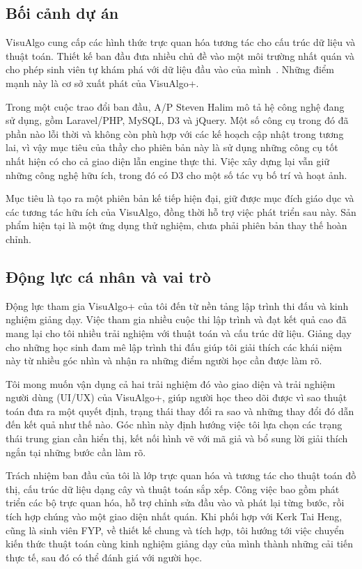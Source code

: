 \documentclass[11pt,a4paper]{article}
\begin{document}
\subsection{Bối cảnh dự án}
VisuAlgo cung cấp các hình thức trực quan hóa tương tác cho cấu trúc dữ liệu và thuật toán. Thiết kế ban đầu đưa nhiều chủ đề vào một môi trường nhất quán và cho phép sinh viên tự khám phá với dữ liệu đầu vào của mình~\cite{halim2012}. Những điểm mạnh này là cơ sở xuất phát của VisuAlgo+.

Trong một cuộc trao đổi ban đầu, A/P Steven Halim mô tả hệ công nghệ đang sử dụng, gồm Laravel/PHP, MySQL, D3 và jQuery. Một số công cụ trong đó đã phần nào lỗi thời và không còn phù hợp với các kế hoạch cập nhật trong tương lai, vì vậy mục tiêu của thầy cho phiên bản này là sử dụng những công cụ tốt nhất hiện có cho cả giao diện lẫn engine thực thi. Việc xây dựng lại vẫn giữ những công nghệ hữu ích, trong đó có D3 cho một số tác vụ bố trí và hoạt ảnh.

Mục tiêu là tạo ra một phiên bản kế tiếp hiện đại, giữ được mục đích giáo dục và các tương tác hữu ích của VisuAlgo, đồng thời hỗ trợ việc phát triển sau này. Sản phẩm hiện tại là một ứng dụng thử nghiệm, chưa phải phiên bản thay thế hoàn chỉnh.

\subsection{Động lực cá nhân và vai trò}
Động lực tham gia VisuAlgo+ của tôi đến từ nền tảng lập trình thi đấu và kinh nghiệm giảng dạy. Việc tham gia nhiều cuộc thi lập trình và đạt kết quả cao đã mang lại cho tôi nhiều trải nghiệm với thuật toán và cấu trúc dữ liệu. Giảng dạy cho những học sinh đam mê lập trình thi đấu giúp tôi giải thích các khái niệm này từ nhiều góc nhìn và nhận ra những điểm người học cần được làm rõ.

Tôi mong muốn vận dụng cả hai trải nghiệm đó vào giao diện và trải nghiệm người dùng (UI/UX) của VisuAlgo+, giúp người học theo dõi được vì sao thuật toán đưa ra một quyết định, trạng thái thay đổi ra sao và những thay đổi đó dẫn đến kết quả như thế nào. Góc nhìn này định hướng việc tôi lựa chọn các trạng thái trung gian cần hiển thị, kết nối hình vẽ với mã giả và bổ sung lời giải thích ngắn tại những bước cần làm rõ.

Trách nhiệm ban đầu của tôi là lớp trực quan hóa và tương tác cho thuật toán đồ thị, cấu trúc dữ liệu dạng cây và thuật toán sắp xếp. Công việc bao gồm phát triển các bộ trực quan hóa, hỗ trợ chỉnh sửa đầu vào và phát lại từng bước, rồi tích hợp chúng vào một giao diện nhất quán. Khi phối hợp với Kerk Tai Heng, cũng là sinh viên FYP, về thiết kế chung và tích hợp, tôi hướng tới việc chuyển kiến thức thuật toán cùng kinh nghiệm giảng dạy của mình thành những cải tiến thực tế, sau đó có thể đánh giá với người học.
\end{document}
